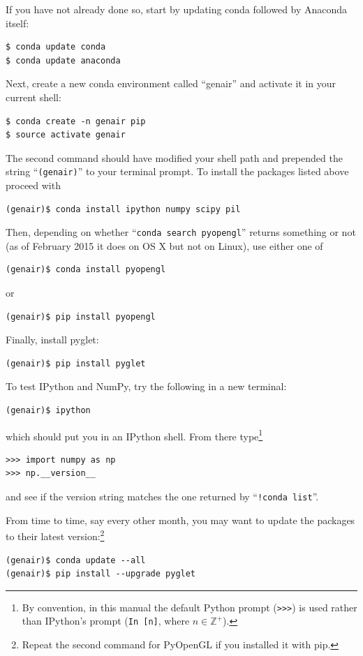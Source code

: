\documentclass[]{article}
\begin{document}
If you have not already done so, start by updating conda followed by 
Anaconda itself:
\begin{verbatim}
$ conda update conda
$ conda update anaconda
\end{verbatim}
Next, create a new conda environment called ``genair'' and activate it 
in your current shell:
\begin{verbatim}
$ conda create -n genair pip
$ source activate genair
\end{verbatim}
The second command should have modified your shell path and prepended 
the string ``\texttt{(genair)}'' to your terminal prompt.  To install 
the packages listed above proceed with
\begin{verbatim}
(genair)$ conda install ipython numpy scipy pil
\end{verbatim}
Then, depending on whether ``\texttt{conda search pyopengl}'' returns 
something or not (as of February 2015 it does on OS X but not on Linux), 
use either one of
\begin{verbatim}
(genair)$ conda install pyopengl
\end{verbatim}
or
\begin{verbatim}
(genair)$ pip install pyopengl
\end{verbatim}
Finally, install pyglet:
\begin{verbatim}
(genair)$ pip install pyglet
\end{verbatim}

To test IPython and NumPy, try the following in a new terminal:
\begin{verbatim}
(genair)$ ipython
\end{verbatim}
which should put you in an IPython shell.  From there type\footnote{By 
convention, in this manual the default Python prompt (\texttt{>>>}) is 
used rather than IPython's prompt (\texttt{In [n]}, where $n \in 
\mathbb{Z}^+$).}
\begin{verbatim}
>>> import numpy as np
>>> np.__version__
\end{verbatim}
and see if the version string matches the one returned by 
``\texttt{!conda list}''.

From time to time, say every other month, you may want to update the 
packages to their latest version:\footnote{Repeat the second command for 
PyOpenGL if you installed it with pip.}
\begin{verbatim}
(genair)$ conda update --all
(genair)$ pip install --upgrade pyglet
\end{verbatim}
\end{document}
